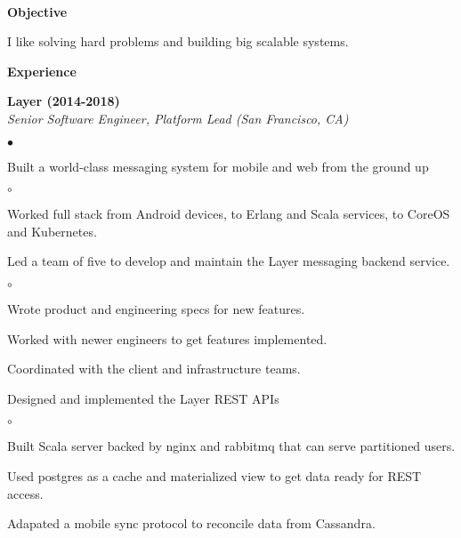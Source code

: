 \documentclass[ComputerScience]{vita}
\newenvironment{suber}[0]
{\begin{list}{$\bullet$}
	{\setlength{\topsep}{-0.4in}
		\setlength{\leftmargin}{0.25in}
		\setlength{\itemsep}{0.01in}}
}
{\end{list}\par}
\newenvironment{suberb}[0]
{\begin{list}{$\circ$}
	{\setlength{\topsep}{-0.4in}
		\setlength{\leftmargin}{0.25in}
		\setlength{\itemsep}{0.01in}}
}
{\end{list}\par}
\begin{document}
\topmargin=-1in
\title{}
\begin{vita}
\quad\\
{\bf {\large Objective}}\ \hrulefill
\begin{list}{}{\setlength{\leftmargin}{.25in}}
\item I like solving hard problems and building big scalable systems.
\end{list}
{\bf{\large Experience}}\ \hrulefill
\begin{list}{}{\setlength{\leftmargin}{.25in}}
    \item {\bf Layer (2014-2018)}\\
    {\em Senior Software Engineer, Platform Lead (San Francisco, CA)}
    \begin{suber}
	\item Built a world-class messaging system for mobile and web from the ground up
		\begin{suberb}
			\item Worked full stack from Android devices, to Erlang and Scala services, to CoreOS and Kubernetes.
		\end{suberb}
    \item Led a team of five to develop and maintain the Layer messaging backend service.
		\begin{suberb}
			\item Wrote product and engineering specs for new features.
            \item Worked with newer engineers to get features implemented.
            \item Coordinated with the client and infrastructure teams.
		\end{suberb}
    \item Designed and implemented the Layer REST APIs
        \begin{suberb}
            \item Built Scala server backed by nginx and rabbitmq that can serve partitioned users.
            \item Used postgres as a cache and materialized view to get data ready for REST access.
            \item Adapated a mobile sync protocol to reconcile data from Cassandra.
        \end{suberb}

\end{suber}
\end{list}
\end{vita}
\end{document}
